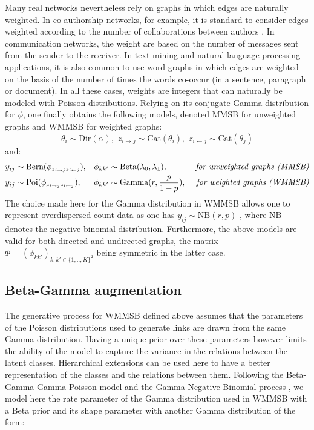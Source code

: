 Many real networks nevertheless rely on graphs in which edges are naturally weighted. In co-authorship networks, for example, it is standard to consider edges weighted according to the number of collaborations between authors \cite{newman2001scientific}. In communication networks, the weight are based on the number of messages sent from the sender to the receiver. In text mining and natural language processing applications, it is also common to use word graphs in which edges are weighted on the basis of the number of times the words co-occur (in a sentence, paragraph or document). In all these cases, weights are integers that can naturally be modeled with Poisson distributions. Relying on its conjugate Gamma distribution for $\phi$, one finally obtains the following models, denoted MMSB for unweighted graphs and WMMSB for weighted graphs:
%
\[
\theta_i \sim \textrm{Dir}(\alpha), \,\, z_{i\rightarrow j} \sim \textrm{Cat}(\theta_i), \,\, z_{i\leftarrow j} \sim \textrm{Cat}(\theta_j)
\]
%
and:
%
\begin{align*} \label{eq:generative}
y_{ij} &\sim \textrm{Bern}(\phi_{z_{i \rightarrow j}z_{i \leftarrow j}}), &\phi_{kk'} &\sim \textrm{Beta}(\lambda_0, \lambda_1), & \textrm{  \textit{for unweighted graphs (MMSB)}} \\
y_{ij} &\sim \textrm{Poi}(\phi_{z_{i \rightarrow j}z_{i \leftarrow j}}), &\phi_{kk'} &\sim \textrm{Gamma}(r, \frac{p}{1-p}),    & \textrm{  \textit{for weighted graphs (WMMSB)}} 
\end{align*}
%
The choice made here for the Gamma distribution in WMMSB allows one to represent overdispersed count data as one has $y_{ij} \sim \textrm{NB}(r,p)$ \cite{zhou2012beta}, where $\textrm{NB}$ denotes the negative binomial distribution. Furthermore, the above models are valid for both directed and undirected graphs, the matrix $\Phi = (\phi_{kk'})_{k,k' \in \{1,..,K\}^2}$ being symmetric in the latter case.


\subsection{Beta-Gamma augmentation}

The generative process for WMMSB defined above assumes that the parameters of the Poisson distributions used to generate links are drawn from the same Gamma distribution. Having a unique prior over these parameters however limits the ability of the model to capture the variance in the relations between the latent classes. Hierarchical extensions can be used here to have a better representation of the classes and the relations between them. Following the Beta-Gamma-Gamma-Poisson model \cite{zhou2012beta} and the Gamma-Negative Binomial process \cite{zhou2015negative}, we model here the rate parameter of the Gamma distribution used in WMMSB with a Beta prior and its shape parameter with another Gamma distribution of the form:

